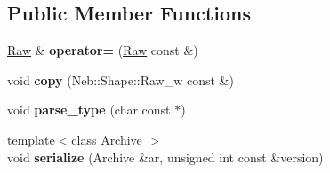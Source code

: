 \subsection*{\-Public \-Member \-Functions}
\begin{DoxyCompactItemize}
\item 
\hypertarget{classNeb_1_1Shape_1_1Raw_a074a67a01eef2f46e2776bfca6aa84e7}{\hyperlink{classNeb_1_1Shape_1_1Raw}{\-Raw} \& {\bfseries operator=} (\hyperlink{classNeb_1_1Shape_1_1Raw}{\-Raw} const \&)}\label{classNeb_1_1Shape_1_1Raw_a074a67a01eef2f46e2776bfca6aa84e7}

\item 
\hypertarget{classNeb_1_1Shape_1_1Raw_aacc8e7328f099cedec7f71fc6641b02f}{void {\bfseries copy} (\-Neb\-::\-Shape\-::\-Raw\-\_\-w const \&)}\label{classNeb_1_1Shape_1_1Raw_aacc8e7328f099cedec7f71fc6641b02f}

\item 
\hypertarget{classNeb_1_1Shape_1_1Raw_a15d804d51a80fe32247cac99d3878a2e}{void {\bfseries parse\-\_\-type} (char const $\ast$)}\label{classNeb_1_1Shape_1_1Raw_a15d804d51a80fe32247cac99d3878a2e}

\item 
\hypertarget{classNeb_1_1Shape_1_1Raw_a83218844b00475e2df413899b02f16eb}{{\footnotesize template$<$class Archive $>$ }\\void {\bfseries serialize} (\-Archive \&ar, unsigned int const \&version)}\label{classNeb_1_1Shape_1_1Raw_a83218844b00475e2df413899b02f16eb}

\end{DoxyCompactItemize}
